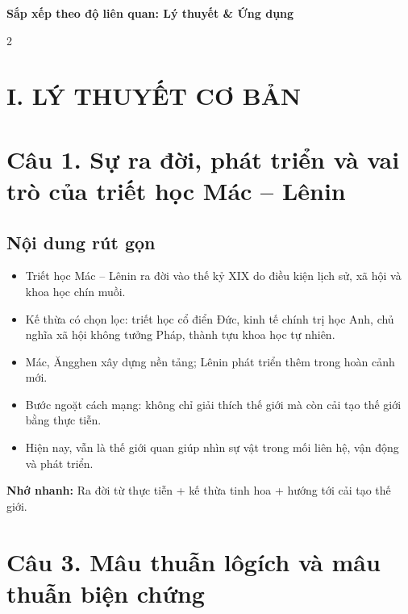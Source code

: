 \documentclass[9pt,a4paper]{extarticle}
\begin{document}
\small
\begin{center}
{\bfseries\fontsize{10}{11}\selectfont Sắp xếp theo độ liên quan: Lý thuyết \& Ứng dụng}\\[-1pt]
\end{center}

\vspace{-3pt}
\begin{multicols*}{2}

\section*{I. LÝ THUYẾT CƠ BẢN}

\section*{Câu 1. Sự ra đời, phát triển và vai trò của triết học Mác -- Lênin}
\subsection*{Nội dung rút gọn}
\begin{itemize}
  \item Triết học Mác -- Lênin ra đời vào thế kỷ XIX do điều kiện lịch sử, xã hội và khoa học chín muồi.
  \item Kế thừa có chọn lọc: triết học cổ điển Đức, kinh tế chính trị học Anh, chủ nghĩa xã hội không tưởng Pháp, thành tựu khoa học tự nhiên.
  \item Mác, Ăngghen xây dựng nền tảng; Lênin phát triển thêm trong hoàn cảnh mới.
  \item Bước ngoặt cách mạng: không chỉ giải thích thế giới mà còn cải tạo thế giới bằng thực tiễn.
  \item Hiện nay, vẫn là thế giới quan giúp nhìn sự vật trong mối liên hệ, vận động và phát triển.
\end{itemize}
\textbf{Nhớ nhanh:} Ra đời từ thực tiễn + kế thừa tinh hoa + hướng tới cải tạo thế giới.

\section*{Câu 3. Mâu thuẫn lôgích và mâu thuẫn biện chứng}

\end{multicols*}
\end{document}

